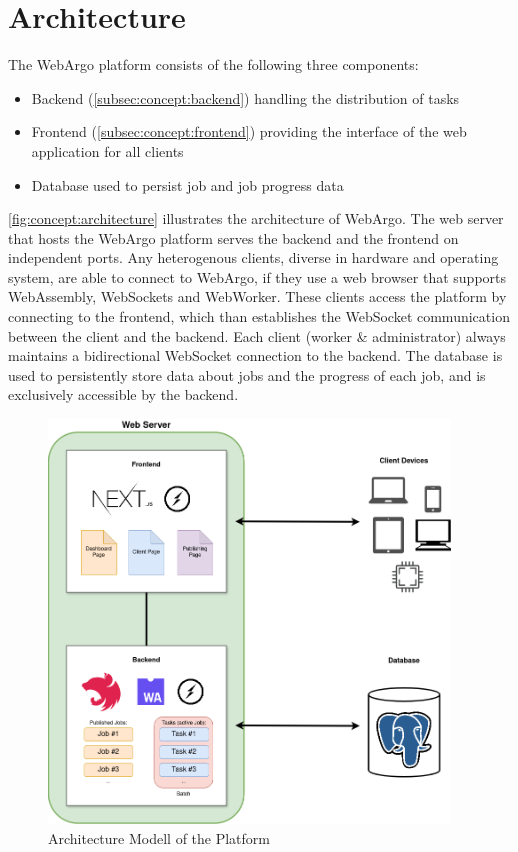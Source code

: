 \section{Architecture}
\label{sec:concept:architecture}
The WebArgo platform consists of the following three components:
\begin{itemize}
    \item Backend (\autoref{subsec:concept:backend}) handling the distribution of tasks
    \item Frontend (\autoref{subsec:concept:frontend}) providing the interface of the web application for all clients
    \item Database used to persist job and job progress data
\end{itemize}
\autoref{fig:concept:architecture} illustrates the architecture of WebArgo. The web server that hosts the WebArgo platform serves the backend and the frontend on independent ports. Any heterogenous clients, diverse in hardware and operating system, are able to connect to WebArgo, if they use a web browser that supports WebAssembly, WebSockets and WebWorker. These clients access the platform by connecting to the frontend, which than establishes the WebSocket communication between the client and the backend. Each client (worker \& administrator) always maintains a bidirectional WebSocket connection to the backend. The database is used to persistently store data about jobs and the progress of each job, and is exclusively accessible by the backend.
\begin{figure}[htbp]
    \centering
    \includegraphics[width=0.95\textwidth]{gfx/figures/WebAssembly-MA.png}
    \caption{Architecture Modell of the Platform}
    \label{fig:concept:architecture}
\end{figure}

